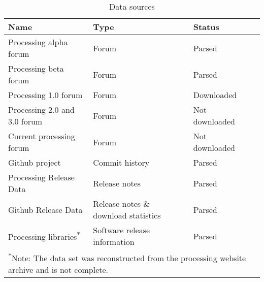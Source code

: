 \begin{table}[h]
    \raggedright
    \caption{Data sources}
    \label{table:data-sources}
    \begin{tabular}{l l l c}
        \toprule
        Name & Type & Status \\
        \midrule
        Processing alpha forum & Forum & Parsed \\
        Processing beta forum & Forum & Parsed  \\
        Processing 1.0 forum & Forum & Downloaded \\
        Processing 2.0 and 3.0 forum & Forum  & Not downloaded \\
        Current processing forum & Forum & Not downloaded\\
        Github project & Commit history & Parsed \\
        Processing Release Data & Release notes & Parsed \\
        Github Release Data & Release notes \& download statistics & Parsed \\
        Processing libraries\textsuperscript{*} & Software release information & Parsed \\

        \bottomrule
        \multicolumn{3}{l}{\footnotesize \textsuperscript{*}Note: The data set was reconstructed from the processing website archive and is not complete.}
    \end{tabular}
  \end{table}